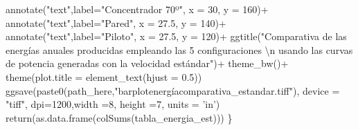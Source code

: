 \documentclass[]{article}
\newenvironment{Shaded}{\begin{snugshade}}{\end{snugshade}}
\newcommand{\DecValTok}[1]{\textcolor[rgb]{0.00,0.00,0.81}{#1}}
\newcommand{\StringTok}[1]{\textcolor[rgb]{0.31,0.60,0.02}{#1}}
\newcommand{\NormalTok}[1]{#1}
\begin{document}
\begin{Shaded}
\begin{Highlighting}[]
{{{{{{\StringTok{    annotate("}\NormalTok{text}\StringTok{",label="}\NormalTok{Concentrador }\DecValTok{70}\NormalTok{º}\StringTok{", x = 30, y = 160)+}
\StringTok{    annotate("}\NormalTok{text}\StringTok{",label="}\NormalTok{Pared}\StringTok{", x = 27.5, y = 140)+}
\StringTok{    annotate("}\NormalTok{text}\StringTok{",label="}\NormalTok{Piloto}\StringTok{", x = 27.5, y = 120)+}
\StringTok{    ggtitle("}\NormalTok{Comparativa de las energías anuales producidas empleando las }\DecValTok{5}\NormalTok{ configuraciones \textbackslash{}n usando las curvas de potencia generadas con la velocidad estándar}\StringTok{")+}
\StringTok{    theme_bw()+}
\StringTok{    theme(plot.title = element_text(hjust = 0.5))}
\StringTok{  }
\StringTok{  ggsave(paste0(path_here,"}\NormalTok{barplotenergíacomparativa_estandar.tiff}\StringTok{"), device = "}\NormalTok{tiff}\StringTok{", dpi=1200,width =8, height =7, units = 'in')}
\StringTok{  }
\StringTok{  return(as.data.frame(colSums(tabla_energia_est)))}
\StringTok{  }
\StringTok{  }
\StringTok{  }
\StringTok{\}}

}}}}}}
\end{Highlighting}
\end{Shaded}
\end{document}
